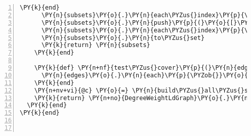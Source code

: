 \begin{Verbatim}[commandchars=\\\{\},numbers=left,firstnumber=1,stepnumber=1,xleftmargin=7mm, fontsize=\small]
      \PY{k}{end}
      \PY{n}{subsets}\PY{o}{.}\PY{n}{each\PYZus{}index}\PY{p}{\PYZob{}}\PY{o}{|}\PY{n}{k}\PY{o}{|} \PY{k}{if} \PY{n}{k}\PY{o}{>}\PY{l+m+mi}{1} \PY{k}{then} \PY{n}{subsets}\PY{o}{[}\PY{n}{k}\PY{o}{]}\PY{o}{.}\PY{n}{push}\PY{p}{(}\PY{n+nv+vi}{@id}\PY{p}{)} \PY{k}{end}\PY{p}{\PYZcb{}}
      \PY{n}{subsets}\PY{o}{.}\PY{n}{push}\PY{p}{(}\PY{o}{[}\PY{n+nv+vi}{@id}\PY{o}{]}\PY{p}{)}
      \PY{n}{subsets}\PY{o}{.}\PY{n}{each\PYZus{}index}\PY{p}{\PYZob{}}\PY{o}{|}\PY{n}{k}\PY{o}{|} \PY{n}{subsets}\PY{o}{[}\PY{n}{k}\PY{o}{]} \PY{o}{=} \PY{n}{subsets}\PY{o}{[}\PY{n}{k}\PY{o}{]}\PY{o}{.}\PY{n}{to\PYZus{}set}\PY{p}{\PYZcb{}}
      \PY{n}{subsets}\PY{o}{.}\PY{n}{to\PYZus{}set}
      \PY{k}{return} \PY{n}{subsets}
    \PY{k}{end}

    \PY{k}{def} \PY{n+nf}{test\PYZus{}cover}\PY{p}{(}\PY{n}{edges}\PY{p}{,} \PY{n}{cover}\PY{p}{)}
      \PY{n}{edges}\PY{o}{.}\PY{n}{each}\PY{p}{\PYZob{}}\PY{o}{|}\PY{n}{k}\PY{o}{|} \PY{k}{return} \PY{k+kp}{false} \PY{k}{if} \PY{n}{cover}\PY{o}{-}\PY{n}{k} \PY{o}{==} \PY{n}{cover}\PY{p}{\PYZcb{}} 
    \PY{k}{end}
    \PY{n+nv+vi}{@c} \PY{o}{=} \PY{n}{build\PYZus{}all\PYZus{}subsets}\PY{o}{.}\PY{n}{select}\PY{p}{\PYZob{}}\PY{o}{|}\PY{n}{k}\PY{o}{|} \PY{n}{test\PYZus{}cover}\PY{p}{(}\PY{n}{alledges}\PY{p}{,} \PY{n}{k}\PY{p}{)}\PY{p}{\PYZcb{}}\PY{o}{.}\PY{n}{to\PYZus{}set}
    \PY{k}{return} \PY{n+no}{DegreeWeightLdGraph}\PY{o}{.}\PY{n}{new}\PY{p}{(}\PY{n+nv+vi}{@c}\PY{p}{,} \PY{n}{nodes}\PY{p}{)}
  \PY{k}{end}  
\PY{k}{end}



\end{Verbatim}
